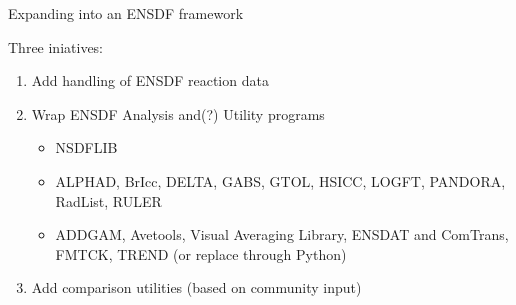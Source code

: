 \documentclass[xcolor=x11names,compress]{beamer}
\renewcommand{\(}{\begin{columns}}
\renewcommand{\)}{\end{columns}}
\newcommand{\<}[1]{\begin{column}{#1}}
\renewcommand{\>}{\end{column}}
\begin{document}
\begin{frame}{Expanding into an ENSDF framework}

    Three iniatives:
    \begin{enumerate}
      \item Add handling of ENSDF \alert{reaction} data
       
      \item Wrap ENSDF \alert{Analysis} and(?) \alert{Utility} programs
      \begin{itemize}
        \item NSDFLIB
        \item ALPHAD, BrIcc, DELTA, GABS, GTOL, HSICC, LOGFT, PANDORA,
        RadList, RULER
        \item ADDGAM, Avetools, Visual Averaging Library, ENSDAT and 
        ComTrans, FMTCK, TREND (or replace through Python)
      \end{itemize}
        
      \item Add comparison utilities (based on \alert{community input})
    \end{enumerate}
    
\end{frame}
\end{document}
